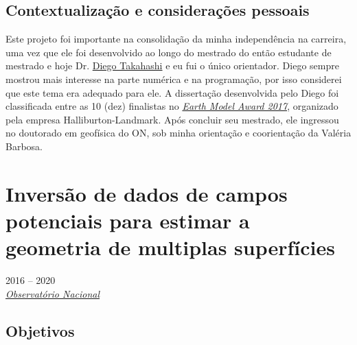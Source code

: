 \subsection*{Contextualização e considerações pessoais}
\label{subsec:proeto-diego-consideracoes}

Este projeto foi importante na consolidação da minha independência na carreira,
uma vez que ele foi desenvolvido ao longo do mestrado do então estudante de mestrado e
hoje Dr. \href{https://lattes.cnpq.br/4939493474727725}{Diego Takahashi} e eu fui o
único orientador.
Diego sempre mostrou mais interesse na parte numérica e na programação, por isso 
considerei que este tema era adequado para ele.
A dissertação desenvolvida pelo Diego foi classificada entre as 10 (dez) finalistas no 
\href{https://www.geolsoc.org.uk/Education-and-Careers/Grants/Earth-Model-Award}{\textit{Earth Model Award 2017}}, organizado pela empresa Halliburton-Landmark.
Após concluir seu mestrado, ele ingressou no doutorado em geofísica do ON, sob minha
orientação e coorientação da Valéria Barbosa.

\section{Inversão de dados de campos potenciais para estimar a geometria de multiplas superfícies} 
\label{sec:projeto-Marcela}

 2016 -- 2020
\vspace{0.3\baselineskip}\\
 \href{https://www.gov.br/observatorio/pt-br}{\textsl{Observatório Nacional}}
\parbox{0.03\textwidth}{\vspace{-0.2\baselineskip} \hfill {}}

\subsection*{Objetivos}

